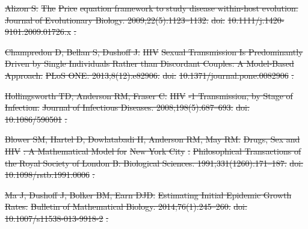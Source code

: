 \documentclass[10pt,letterpaper]{article}
\providecommand{\DIFdeltex}[1]{{\protect\color{red}\sout{#1}}}                      %
\providecommand{\DIFdel}[1]{\texorpdfstring{\DIFdeltex{#1}}{}} %
\begin{document}
\DIFdel{Alizon S.
}%
\DIFdel{The }%
\DIFdel{Price}%
\DIFdel{equation framework to study disease within-host
  evolution.
}%
\DIFdel{Journal of Evolutionary Biology. 2009;22(5):1123--1132.
}%
\DIFdel{doi:}%
\DIFdel{10.1111/j.1420-9101.2009.01726.x}%
\DIFdel{.
}%

\DIFdel{Champredon D, Bellan S, Dushoff J.
}%
\DIFdel{HIV}%
\DIFdel{Sexual Transmission Is Predominantly Driven by Single
  Individuals Rather than Discordant Couples: A Model-Based Approach.
}%
\DIFdel{PLoS ONE. 2013;8(12):e82906.
}%
\DIFdel{doi:}%
\DIFdel{10.1371/journal.pone.0082906}%
\DIFdel{.
}%

\DIFdel{Hollingsworth TD, Anderson RM, Fraser C.
}%
\DIFdel{HIV}%
\DIFdel{-1 Transmission, by Stage of Infection.
}%
\DIFdel{Journal of Infectious Diseases. 2008;198(5):687--693.
}%
\DIFdel{doi:}%
\DIFdel{10.1086/590501}%
\DIFdel{.
}%

\DIFdel{Blower SM, Hartel D, Dowlatabadi H, Anderson RM, May RM.
}%
\DIFdel{Drugs, Sex and }%
\DIFdel{HIV}%
\DIFdel{: A Mathematical Model for }%
\DIFdel{New York City}%
\DIFdel{.
}%
\DIFdel{Philosophical Transactions of the Royal Society of London B:
  Biological Sciences. 1991;331(1260):171--187.
}%
\DIFdel{doi:}%
\DIFdel{10.1098/rstb.1991.0006}%
\DIFdel{.
}%

\DIFdel{Ma J, Dushoff J, Bolker BM, Earn DJD.}%
\DIFdel{Estimating Initial Epidemic Growth Rates. }%
\DIFdel{Bulletin of Mathematical Biology. 2014;76(1):245--260.
}%
\DIFdel{doi:}%
\DIFdel{10.1007/s11538-013-9918-2}%
\DIFdel{.
}%
\end{document}
